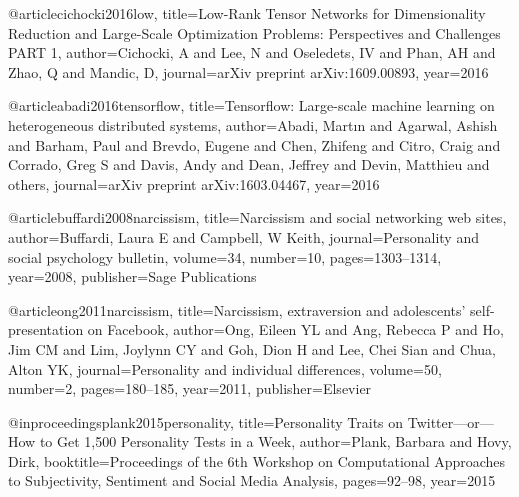 @article{cichocki2016low,
  title={Low-Rank Tensor Networks for Dimensionality Reduction and Large-Scale Optimization Problems: Perspectives and Challenges PART 1},
  author={Cichocki, A and Lee, N and Oseledets, IV and Phan, AH and Zhao, Q and Mandic, D},
  journal={arXiv preprint arXiv:1609.00893},
  year={2016}
}

@article{abadi2016tensorflow,
  title={Tensorflow: Large-scale machine learning on heterogeneous distributed systems},
  author={Abadi, Mart{\i}n and Agarwal, Ashish and Barham, Paul and Brevdo, Eugene and Chen, Zhifeng and Citro, Craig and Corrado, Greg S and Davis, Andy and Dean, Jeffrey and Devin, Matthieu and others},
  journal={arXiv preprint arXiv:1603.04467},
  year={2016}
}



@article{buffardi2008narcissism,
  title={Narcissism and social networking web sites},
  author={Buffardi, Laura E and Campbell, W Keith},
  journal={Personality and social psychology bulletin},
  volume={34},
  number={10},
  pages={1303--1314},
  year={2008},
  publisher={Sage Publications}
}

@article{ong2011narcissism,
  title={Narcissism, extraversion and adolescents’ self-presentation on Facebook},
  author={Ong, Eileen YL and Ang, Rebecca P and Ho, Jim CM and Lim, Joylynn CY and Goh, Dion H and Lee, Chei Sian and Chua, Alton YK},
  journal={Personality and individual differences},
  volume={50},
  number={2},
  pages={180--185},
  year={2011},
  publisher={Elsevier}
}

@inproceedings{plank2015personality,
  title={Personality Traits on Twitter—or—How to Get 1,500 Personality Tests in a Week},
  author={Plank, Barbara and Hovy, Dirk},
  booktitle={Proceedings of the 6th Workshop on Computational Approaches to Subjectivity, Sentiment and Social Media Analysis},
  pages={92--98},
  year={2015}
}





